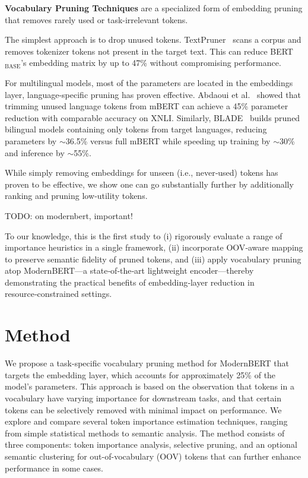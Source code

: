 \documentclass[twocolumn]{article}
\begin{document}
\textbf{Vocabulary Pruning Techniques} are a specialized form of embedding pruning that removes rarely used or task-irrelevant tokens.

The simplest approach is to drop unused tokens. TextPruner~\cite{shen2022textpruner} scans a corpus and removes tokenizer tokens not present in the target text. This can reduce BERT$_{\text{BASE}}$'s embedding matrix by up to 47\% without compromising performance.

For multilingual models, most of the parameters are located in the embeddings layer, language-specific pruning has proven effective. Abdaoui et al.~\cite{abdaoui2020load} showed that trimming unused language tokens from mBERT can achieve a 45\% parameter reduction with comparable accuracy on XNLI. Similarly, BLADE~\cite{nair2023blade} builds pruned bilingual models containing only tokens from target languages, reducing parameters by $\sim$36.5\% versus full mBERT while speeding up training by $\sim$30\% and inference by $\sim$55\%.

While simply removing embeddings for unseen (i.e., never‑used) tokens has proven to be effective, we show one can go substantially further by additionally ranking and pruning low‑utility tokens. 

TODO: on modernbert, important!

To our knowledge, this is the first study to (i) rigorously evaluate a range of importance heuristics in a single framework, (ii) incorporate OOV‑aware mapping to preserve semantic fidelity of pruned tokens, and (iii) apply vocabulary pruning atop ModernBERT—a state‑of‑the‑art lightweight encoder—thereby demonstrating the practical benefits of embedding‑layer reduction in resource‑constrained settings.

\newpage
\section{Method}
We propose a task-specific vocabulary pruning method for ModernBERT that targets the embedding layer, which accounts for approximately 25\% of the model's parameters. This approach is based on the observation that tokens in a vocabulary have varying importance for downstream tasks, and that certain tokens can be selectively removed with minimal impact on performance. We explore and compare several token importance estimation techniques, ranging from simple statistical methods to semantic analysis. The method consists of three components: token importance analysis, selective pruning, and an optional semantic clustering for out-of-vocabulary (OOV) tokens that can further enhance performance in some cases.
\end{document}
